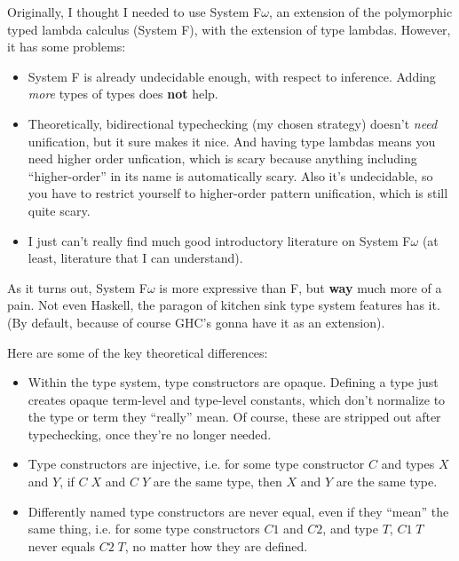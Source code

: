 \documentclass[11pt]{article}
\begin{document}
Originally, I thought I needed to use System F$\omega$, an extension of the
    polymorphic typed lambda calculus (System F), with the extension of type
    lambdas. However, it has some problems:

\begin{itemize}
    \item System F is already undecidable enough, with respect to inference.
        Adding \emph{more} types of types does \textbf{not} help.
    \item Theoretically, bidirectional typechecking (my chosen strategy)
        doesn't \emph{need} unification, but it sure makes it nice. And having
        type lambdas means you need higher order unfication, which is scary
        because anything including ``higher-order'' in its name is automatically
        scary. Also it's undecidable, so you have to restrict yourself to
        higher-order pattern unification, which is still quite scary.
    \item I just can't really find much good introductory literature on
        System F$\omega$ (at least, literature that I can understand).
\end{itemize}

As it turns out, System F$\omega$ is more expressive than F, but \textbf{way}
    much more of a pain. Not even Haskell, the paragon of kitchen sink type
    system features has it. (By default, because of course GHC's gonna have it
    as an extension).

Here are some of the key theoretical differences:

\begin{itemize}
    \item Within the type system, type constructors are opaque. Defining a type
        just creates opaque term-level and type-level constants, which don't
        normalize to the type or term they ``really'' mean. Of course, these
        are stripped out after typechecking, once they're no longer needed.
    \item Type constructors are injective, i.e. for some type constructor $C$
        and types $X$ and $Y$, if $C\;X$ and $C\;Y$ are the same type, then $X$
        and $Y$ are the same type.
    \item Differently named type constructors are never equal, even if they
        ``mean'' the same thing, i.e. for some type constructors $C1$ and $C2$,
        and type $T$, $C1\;T$ never equals $C2\;T$, no matter how they are
        defined.
\end{itemize}
\end{document}
